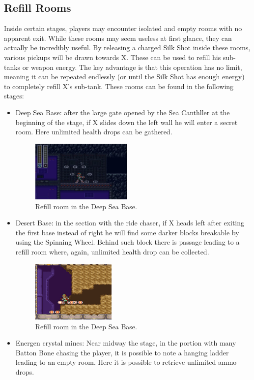 \subsection{Refill Rooms}\label{sec:refill}
Inside certain stages, players may encounter isolated and empty rooms with no apparent exit. While these rooms may seem useless at first glance, they can actually be incredibly useful. By releasing a charged Silk Shot inside these rooms, various pickups will be drawn towards X. These can be used to refill his sub-tanks or weapon energy. The key advantage is that this operation has no limit, meaning it can be repeated endlessly (or until the Silk Shot has enough energy) to completely refill X's sub-tank. These rooms can be found in the following stages:
\begin{itemize}
	\item Deep Sea Base: after the large gate opened by the Sea Canthller at the beginning of the stage, if X slides down the left wall he will enter a secret room. Here unlimited health drops can be gathered.
	\begin{figure}[htp]
		\centering
		\includegraphics[height=3cm]{figures/X2/Bubble_crab/Crab_farming_spot.png}
		\caption{Refill room in the Deep Sea Base.}
	\end{figure}
	\item Desert Base: in the section with the ride chaser, if X heads left after exiting the first base instead of right he will find some darker blocks breakable by using the Spinning  Wheel. Behind such block there is passage leading to a refill room where, again, unlimited health drop can be collected.
	\begin{figure}[htp]
		\centering
		\includegraphics[height=3cm]{figures/X2/Overdrive_ostrich/ostrich_refill.jpg}
		\caption{Refill room in the Deep Sea Base.}
	\end{figure}
	\item Energen crystal mines: Near midway the stage, in the portion with many Batton Bone chasing the player, it is possible to note a hanging ladder leading to an empty room. Here it is possible to retrieve unlimited ammo drops.

\end{itemize}
